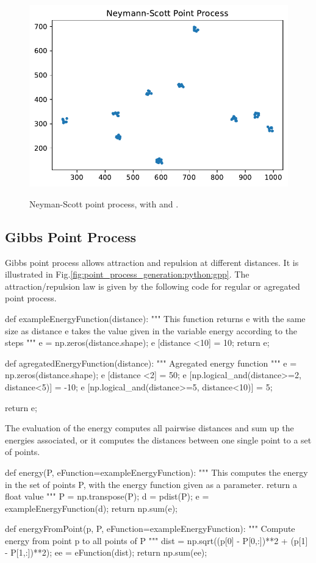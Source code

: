 \begin{figure}[H]
 \centering\caption{Neyman-Scott point process, with  and .}%
 \includegraphics[width=.5\textwidth]{nspp.pdf}%
 \label{fig:point_process_generation:python:nspp}%
\end{figure}


\subsection{Gibbs Point Process}
Gibbs point process allows attraction and repulsion at different distances. It is illustrated in Fig.\ref{fig:point_process_generation:python:gpp}. The attraction/repulsion law is given by the following code for regular or agregated point process.

\begin{python}    
def exampleEnergyFunction(distance):
    """ This function returns e with the same size as distance
    e takes the value given in the variable energy according to the steps
    """
    e = np.zeros(distance.shape);
    e [distance <10] = 10;
    return e;

def agregatedEnergyFunction(distance):
    """ 
    Agregated energy function
    """
    e = np.zeros(distance.shape);
    e [distance <2] = 50;
    e [np.logical_and(distance>=2, distance<5)] = -10;
    e [np.logical_and(distance>=5, distance<10)] = 5;

    return e;
\end{python}

The evaluation of the energy computes all pairwise distances and sum up the energies associated, or it computes the distances between one single point to a set of points.

\begin{python}
def energy(P, eFunction=exampleEnergyFunction):
    """
    This computes the energy in the set of points P, with the energy function
    given as a parameter.
    return a float value
    """
    P = np.transpose(P);
    d = pdist(P);
    e = exampleEnergyFunction(d);
    return np.sum(e);
    
def energyFromPoint(p, P, eFunction=exampleEnergyFunction):
    """
    Compute energy from point p to all points of P
    """
    dist = np.sqrt((p[0] - P[0,:])**2 + (p[1] - P[1,:])**2);
    ee = eFunction(dist);
    return np.sum(ee);
\end{python}

